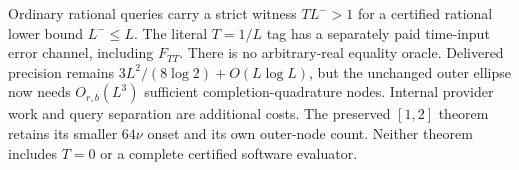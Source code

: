Ordinary rational queries carry a strict witness $T L^->1$ for a
certified rational lower bound $L^-\le L$. The literal $T=1/L$ tag
has a separately paid time-input error channel, including $F_{TT}$.
There is no arbitrary-real equality oracle. Delivered precision remains
$3L^2/(8\log2)+O(L\log L)$, but the unchanged outer ellipse now needs
$O_{r,b}(L^3)$ sufficient completion-quadrature nodes. Internal provider
work and query separation are additional costs. The preserved $[1,2]$
theorem retains its smaller $64\nu$ onset and its own outer-node count.
Neither theorem includes $T=0$ or a complete certified software evaluator.
